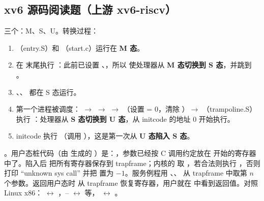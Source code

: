 \subsection{xv6 源码阅读题（上游 xv6-riscv）}

三个：M、S、U。转换过程：
\begin{enumerate}
    \item {}（entry.S）和 （start.c）运行在 \textbf{M 态}。
    \item 在  末尾执行 ：此前已设置 、，所以  使处理器从 \textbf{M 态切换到 S 态}，并跳到 。
    \item {}、、 都在 S 态运行。
    \item 第一个进程被调度： $\to$  $\to$  $\to$ （设置  = 0，清除 ）$\to$ （trampoline.S）执行 ：处理器从 \textbf{S 态切换到 U 态}，从 initcode 的地址 0 开始执行。
    \item initcode 执行 （调用 ），这是第一次从 \textbf{U 态陷入 S 态}。
\end{enumerate}

。用户态桩代码（由  生成的 ）是：，参数已经按 C 调用约定放在  开始的寄存器中了。陷入后  把所有寄存器保存到 trapframe；内核的  取 ，若合法则执行 ，否则打印 “unknown sys call” 并把  置为 $-1$。服务例程用 、、 从 trapframe 中取第 $n$ 个参数。返回用户态时  从 trapframe 恢复寄存器，用户就在  中看到返回值。对照 Linux x86： $\leftrightarrow$ ，– $\leftrightarrow$  等， $\leftrightarrow$ 。

